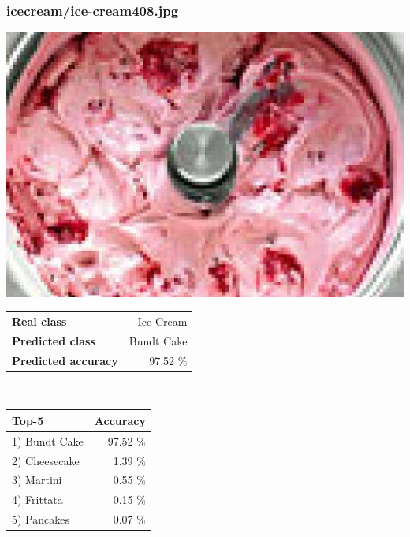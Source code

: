 \subsubsection{ice\textunderscore cream/ice-cream408.jpg}

\begin{minipage}[t]{0.4\textwidth}
	\vspace{0pt}
	\includegraphics[width=\linewidth]{images/evaluation-images/ice_cream/ice-cream408.jpg}
\end{minipage}
\hfill
\begin{minipage}[t]{0.5\textwidth}
	\vspace{0pt}\raggedright
	\begin{tabularx}{\textwidth}{X r}
		\small \textbf{Real class} & \small Ice Cream\\
		\small \textbf{Predicted class} & \small Bundt Cake\\
		\small \textbf{Predicted accuracy} & \small 97.52 \%
    \end{tabularx}\\
    
    \vspace{6pt}
	\begin{tabularx}{\textwidth}{X r}
        \small \textbf{Top-5} & \small \textbf{Accuracy} \\
        \hline
		\small 1) Bundt Cake & \small 97.52 \%\\\small 2) Cheesecake & \small 1.39 \%\\\small 3) Martini & \small 0.55 \%\\\small 4) Frittata & \small 0.15 \%\\\small 5) Pancakes & \small 0.07 \%
    \end{tabularx}
\end{minipage}
    
